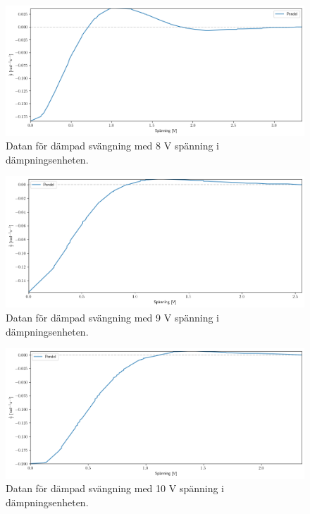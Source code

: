 \documentclass[12pt, a4paper]{article}
\begin{document}
\begin{figure}[hp]
    \includegraphics[width=\textwidth]{graf_8_v_centered}
    \caption{Datan för dämpad svängning med 8 V spänning i dämpningsenheten.}
    \label{fig:data_8_v}
\end{figure}

\begin{figure}[hp]
    \includegraphics[width=\textwidth]{graf_9_v_centered}
    \caption{Datan för dämpad svängning med 9 V spänning i dämpningsenheten.}
    \label{fig:data_9_v}
\end{figure}

\begin{figure}[hp]
    \includegraphics[width=\textwidth]{graf_10_v_centered}
    \caption{Datan för dämpad svängning med 10 V spänning i dämpningsenheten.}
    \label{fig:data_10_v}
\end{figure}
\end{document}
